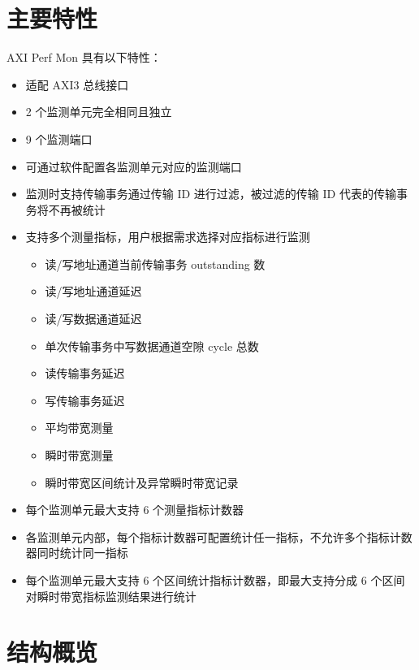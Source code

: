 \documentclass[main\_\_CN.tex]{subfiles}
\begin{document}
\section{主要特性}

AXI Perf Mon 具有以下特性：

\begin{itemize}
    \item 适配 AXI3 总线接口
    \item 2 个监测单元完全相同且独立
    \item 9 个监测端口
    \item 可通过软件配置各监测单元对应的监测端口
    \item 监测时支持传输事务通过传输 ID 进行过滤，被过滤的传输 ID 代表的传输事务将不再被统计
    \item 支持多个测量指标，用户根据需求选择对应指标进行监测
        \begin{itemize}
          \item 读/写地址通道当前传输事务 outstanding 数
          \item 读/写地址通道延迟
          \item 读/写数据通道延迟   
          \item 单次传输事务中写数据通道空隙 cycle 总数
          \item 读传输事务延迟
          \item 写传输事务延迟     
          \item 平均带宽测量
          \item 瞬时带宽测量
          \item 瞬时带宽区间统计及异常瞬时带宽记录
        \end{itemize}
    
    \item 每个监测单元最大支持 6 个测量指标计数器
    \item 各监测单元内部，每个指标计数器可配置统计任一指标，不允许多个指标计数器同时统计同一指标
    \item 每个监测单元最大支持 6 个区间统计指标计数器，即最大支持分成 6 个区间对瞬时带宽指标监测结果进行统计\\ 

\end{itemize}


\section{结构概览}
\label{sec:aximon-arch-overview}
\end{document}
